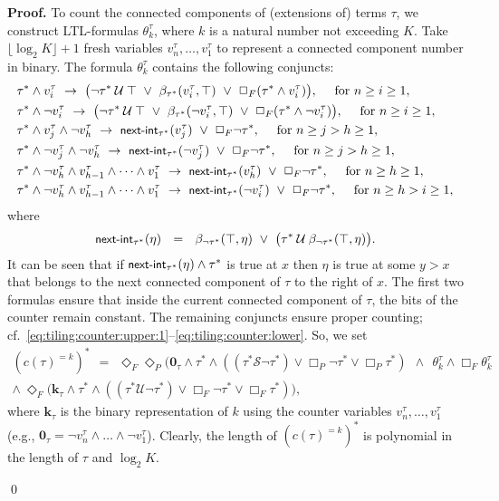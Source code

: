\documentclass{LMCS}
\renewenvironment{proof}{\par\noindent\textbf{Proof.}}{\mbox{}\qed\par\medskip}
\theoremstyle{plain}
\newcommand{\since}{\mathbin{\mathcal{S}}}
\newcommand{\until}{\mathbin{\mathcal{U}}}
\begin{document}
\begin{proof}
To count the connected components of (extensions of) terms $\tau$,
we construct LTL-formulas $\theta_k^\tau$, where $k$ is a natural
number not exceeding $K$. Take $\lfloor\log_2 K\rfloor + 1$ fresh variables $v^\tau_n,
\dots,v^\tau_1$ to represent a connected component number in binary.
The formula $\theta_k^\tau$ contains the following conjuncts:
\begin{align*}
& \tau^* \land v^\tau_i \ \to \ \bigl(\neg\tau^*\until\top \ \lor \ \beta_{\tau^*}(v^\tau_i,\top) \ \lor \ \Box_F(\tau^*\land v^\tau_i)\bigr),\quad \text{ for } n \geq i \geq 1,\\
& \tau^* \land \neg v^\tau_i \ \to \ \bigl(\neg\tau^*\until\top \ \lor \ \beta_{\tau^*}(\neg v^\tau_i,\top) \ \lor \ \Box_F(\tau^*\land\neg v^\tau_i)\bigr),\quad \text{ for } n \geq i \geq 1,\\ & \tau^*\land v^\tau_j \land \neg v^\tau_h \ \to \ \textsf{\small next-int}_{\tau^*}(v^\tau_j)  \ \lor \ \Box_F\neg\tau^*,\quad \text{ for } n \geq j > h \geq 1,\\
& \tau^*\land \neg v^\tau_j \land \neg v^\tau_h  \ \to \ \textsf{\small next-int}_{\tau^*}(\neg v^\tau_j)  \ \lor \ \Box_F\neg\tau^*,\quad \text{ for } n \geq j > h \geq 1,\\
& \tau^*\land \neg v^\tau_h \land v^\tau_{h-1} \land \dots \land v^\tau_1 \ \to \ \textsf{\small next-int}_{\tau^*}(v^\tau_h)  \ \lor \ \Box_F\neg\tau^*, \quad \text{ for } n \geq h \geq 1,\\
& \tau^*\land \neg v^\tau_h \land v^\tau_{h-1} \land \dots \land v^\tau_1 \ \to \ \textsf{\small next-int}_{\tau^*}(\neg v^\tau_i)  \ \lor \ \Box_F\neg\tau^*,\quad \text{ for } n \geq h > i \geq 1,\end{align*}
where
\begin{equation*}
\textsf{\small next-int}_{\tau^*}(\eta) \ \ = \ \ \beta_{\neg\tau^*}(\top,\eta) \ \lor \ \bigl(\tau^* \until \beta_{\neg\tau^*}(\top,\eta)\bigr).
\end{equation*}
It can be seen that if $\textsf{\small next-int}_{\tau^*}(\eta)\land \tau^*$ is
true at $x$ then $\eta$ is true at some $y > x$ that belongs to the next connected component of $\tau$ to the right of $x$.
The first two formulas
ensure that inside the current connected component of $\tau$, the bits
of the counter remain constant. The remaining conjuncts ensure proper counting; cf.~\eqref{eq:tiling:counter:upper:1}--\eqref{eq:tiling:counter:lower}. So, we set
\begin{multline*}
(c(\tau)^{= k})^{\ast} \ \  = \ \
\Diamond_F\Diamond_P\bigl(\textbf{0}_\tau\land\tau^* \land ((\tau^* \since \neg \tau^*) \lor \Box_P \neg \tau^* \lor \Box_P \tau^*) \ \ \land \ \  \theta_k^\tau \land \Box_F\theta_k^\tau \\
 \land \ \Diamond_F(\textbf{k}_\tau\land\tau^* \land ((\tau^* \until \neg \tau^*) \lor \Box_F\neg\tau^* \lor \Box_F\tau^*) \bigr),
\end{multline*}
where $\textbf{k}_\tau$ is the binary representation of $k$ using the
counter variables $v_n^\tau,\dots,v_1^\tau$ (e.g., $\textbf{0}_\tau = \neg v_n^\tau \land \dots \land \neg v_1^\tau$). Clearly, the length of $(c(\tau)^{= k})^{\ast}$ is polynomial in the length of $\tau$ and $\log_2 K$.



\end{proof}
\end{document}
